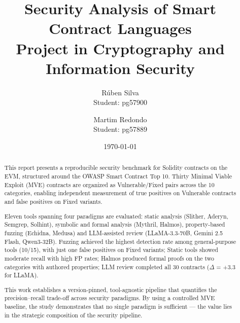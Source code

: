 \documentclass[11pt, a4paper, twocolumn]{article}
\title{\vspace{-1.5cm}\textbf{Security Analysis of Smart Contract Languages} \\ \large Project in Cryptography and Information Security}
\author{Rúben Silva \\ \small Student: pg57900 \and Martim Redondo \\ \small Student: pg57889}
\date{\today}
\begin{document}
\maketitle

\begin{abstract}

This report presents a reproducible security benchmark for Solidity contracts on the EVM, structured around the OWASP Smart Contract Top 10. Thirty Minimal Viable Exploit (MVE) contracts are organized as Vulnerable/Fixed pairs across the 10 categories, enabling independent measurement of true positives on Vulnerable contracts and false positives on Fixed variants.

Eleven tools spanning four paradigms are evaluated: static analysis (Slither, Aderyn, Semgrep, Solhint), symbolic and formal analysis (Mythril, Halmos), property-based fuzzing (Echidna, Medusa) and LLM-assisted review (LLaMA-3.3-70B, Gemini 2.5 Flash, Qwen3-32B). Fuzzing achieved the highest detection rate among general-purpose tools (10/15), with just one false positives on Fixed variants; Static tools showed moderate recall with high FP rates; Halmos produced formal proofs on the two categories with authored properties; LLM review completed all 30 contracts ($\Delta$ = +3.3 for LLaMA).

This work establishes a version-pinned, tool-agnostic pipeline that quantifies the precision--recall trade-off across security paradigms. By using a controlled MVE baseline, the study demonstrates that no single paradigm is sufficient — the value lies in the strategic composition of the security pipeline.

\end{abstract}








\printbibliography[heading=bibintoc, title={References}]
\end{document}
